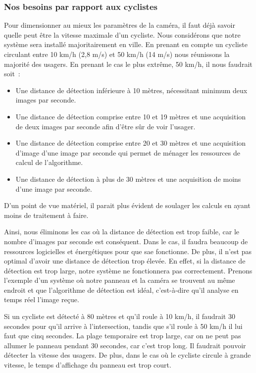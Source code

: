\subsubsection{Nos besoins par rapport aux cyclistes}
\label{sec:camera_cycliste}

Pour dimensionner au mieux les paramètres de la caméra, il faut déjà savoir quelle peut être la vitesse maximale d’un cycliste.
Nous considérons que notre système sera installé majoritairement en ville.
En prenant en compte un cycliste circulant entre 10 km/h (2,8 m/s) et 50 km/h (14 m/s) nous réunissons la majorité des usagers.
En prenant le cas le plus extrême, 50 km/h, il nous faudrait soit :
\begin{itemize}
    \item Une distance de détection inférieure à 10 mètres, nécessitant minimum deux images par seconde.
    \item Une distance de détection comprise entre 10 et 19 mètres et une acquisition de deux images par seconde afin
          d’être sûr de voir l’usager.
    \item Une distance de détection comprise entre 20 et 30 mètres et une acquisition d’image d'une image par seconde qui permet
          de ménager les ressources de calcul de l’algorithme.
    \item Une distance de détection à plus de 30 mètres et une acquisition de moins d'une image par seconde.
\end{itemize}
D'un point de vue matériel, il parait plus évident de soulager les calculs en ayant moins de traitement à faire.

Ainsi, nous éliminons les cas où la distance de détection est trop faible, car le nombre d'images par seconde est conséquent.
Dans le cas, il faudra beaucoup de ressources logicielles et énergétiques pour que \gls{sae} fonctionne.
De plus, il n'est pas optimal d'avoir une distance de détection trop élevée.
En effet, si la distance de détection est trop large, notre système ne fonctionnera pas correctement.
Prenons l'exemple d'un système où notre panneau et la caméra se trouvent au même endroit et que l'algorithme de détection est idéal,
c'est-à-dire qu'il analyse en temps réel l'image reçue.
\begin{example}
    Si un cycliste est détecté à 80 mètres et qu'il roule à 10 km/h, il faudrait 30 secondes pour qu'il arrive à l'intersection,
    tandis que s'il roule à 50 km/h il lui faut que cinq secondes. La plage temporaire est trop large,
    car on ne peut pas allumer le panneau pendant 30 secondes, car c'est trop long. Il faudrait pouvoir détecter la vitesse des usagers.
    De plus, dans le cas où le cycliste circule à grande vitesse, le temps d'affichage du panneau est trop court.
\end{example}


